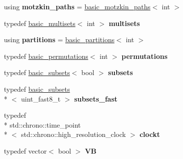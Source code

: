 \begin{DoxyCompactItemize}
\item 
\hypertarget{namespacedscr_ab389c1cceda52f2a397536f66ac58652}{using {\bfseries motzkin\-\_\-paths} = \hyperlink{classdscr_1_1basic__motzkin__paths}{basic\-\_\-motzkin\-\_\-paths}$<$ int $>$}\label{namespacedscr_ab389c1cceda52f2a397536f66ac58652}

\item 
\hypertarget{namespacedscr_a9fb85b7fa706721fa7ad18509bf1564d}{typedef \hyperlink{classdscr_1_1basic__multisets}{basic\-\_\-multisets}$<$ int $>$ {\bfseries multisets}}\label{namespacedscr_a9fb85b7fa706721fa7ad18509bf1564d}

\item 
\hypertarget{namespacedscr_a39ba3136cba04f5d461db0c30cbedc1f}{using {\bfseries partitions} = \hyperlink{classdscr_1_1basic__partitions}{basic\-\_\-partitions}$<$ int $>$}\label{namespacedscr_a39ba3136cba04f5d461db0c30cbedc1f}

\item 
\hypertarget{namespacedscr_a9e61754e725e663b0f40bbfff8bafcfc}{typedef \hyperlink{classdscr_1_1basic__permutations}{basic\-\_\-permutations}$<$ int $>$ {\bfseries permutations}}\label{namespacedscr_a9e61754e725e663b0f40bbfff8bafcfc}

\item 
\hypertarget{namespacedscr_aa55af7426ea06b63ae05871bda088651}{typedef \hyperlink{classdscr_1_1basic__subsets}{basic\-\_\-subsets}$<$ bool $>$ {\bfseries subsets}}\label{namespacedscr_aa55af7426ea06b63ae05871bda088651}

\item 
\hypertarget{namespacedscr_ab2f40020ed8d272641a762cc88e5f6d6}{typedef \hyperlink{classdscr_1_1basic__subsets}{basic\-\_\-subsets}\\*
$<$ uint\-\_\-fast8\-\_\-t $>$ {\bfseries subsets\-\_\-fast}}\label{namespacedscr_ab2f40020ed8d272641a762cc88e5f6d6}

\item 
\hypertarget{namespacedscr_a1b3465ad982bf9626244c6068ae9e2e8}{typedef \\*
std\-::chrono\-::time\-\_\-point\\*
$<$ std\-::chrono\-::high\-\_\-resolution\-\_\-clock $>$ {\bfseries clockt}}\label{namespacedscr_a1b3465ad982bf9626244c6068ae9e2e8}

\item 
\hypertarget{namespacedscr_aced4011fd0d63ce7e7ce407e22ee71bd}{typedef vector$<$ bool $>$ {\bfseries V\-B}}\label{namespacedscr_aced4011fd0d63ce7e7ce407e22ee71bd}


\end{DoxyCompactItemize}
